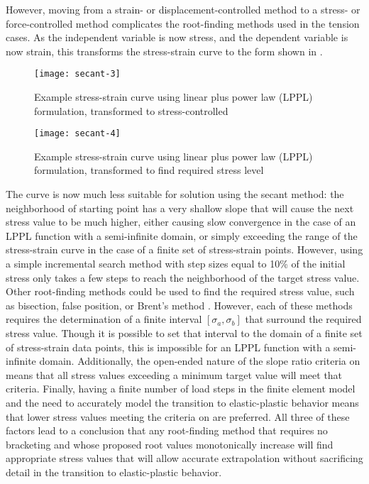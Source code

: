 However, moving from a strain- or displacement-controlled method to a stress- or force-controlled method complicates the root-finding methods used in the tension cases.
As the independent variable is now stress, and the dependent variable is now strain, this transforms the stress-strain curve to the form shown in .
\begin{figure}[tbp]
\centering
\texttt{[image: secant-3]}
\caption{\label{fig:secant-3}Example stress-strain curve using linear plus power law (LPPL) formulation, transformed to stress-controlled}
\end{figure}
\begin{figure}[tbp]
\centering
\texttt{[image: secant-4]}
\caption{\label{fig:secant-4}Example stress-strain curve using linear plus power law (LPPL) formulation, transformed to find required stress level}
\end{figure}
The curve is now much less suitable for solution using the secant method: the neighborhood of starting point has a very shallow slope that will cause the next stress value to be much higher, either causing slow convergence in the case of an LPPL function with a semi-infinite domain, or simply exceeding the range of the stress-strain curve in the case of a finite set of stress-strain points.
However, using a simple incremental search method with step sizes equal to 10\% of the initial stress only takes a few steps to reach the neighborhood of the target stress value.
Other root-finding methods could be used to find the required stress value, such as bisection, false position, or Brent's method \cite{numericalrecipes1986}.
However, each of these methods requires the determination of a finite interval \([\sigma_a, \sigma_b]\) that surround the required stress value.
Though it is possible to set that interval to the domain of a finite set of stress-strain data points, this is impossible for an LPPL function with a semi-infinite domain.
Additionally, the open-ended nature of the slope ratio criteria on  means that all stress values exceeding a minimum target value will meet that criteria.
Finally, having a finite number of load steps in the finite element model and the need to accurately model the transition to elastic-plastic behavior means that lower stress values meeting the criteria on  are preferred.
All three of these factors lead to a conclusion that any root-finding method that requires no bracketing and whose proposed root values monotonically increase will find appropriate stress values that will allow accurate extrapolation without sacrificing detail in the transition to elastic-plastic behavior.
